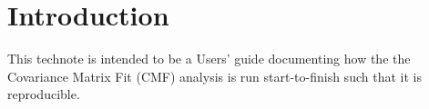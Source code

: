 \section{Introduction}

This technote is intended to be a Users' guide documenting how the the Covariance Matrix Fit (CMF) analysis is run start-to-finish such that it is reproducible. 